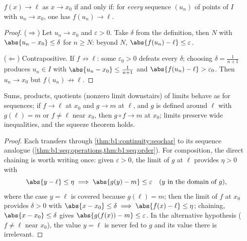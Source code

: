 \begin{theorem}\label{thm:b1:continuity:seqchar}
$f(x) \to \ell$ as $x \to x_0$ if and only if: for \emph{every}
sequence $(u_n)$ of points of $I$ with $u_n \to x_0$, one has
$f(u_n) \to \ell$.
\end{theorem}

\begin{proof}
($\Rightarrow$) Let $u_n \to x_0$ and $\varepsilon > 0$. Take
$\delta$ from the definition, then $N$ with $\abs{u_n - x_0} \leq
\delta$ for $n \geq N$: beyond $N$, $\abs{f(u_n) - \ell} \leq
\varepsilon$.

($\Leftarrow$) Contrapositive. If $f \not\to \ell$: some
$\varepsilon_0 > 0$ defeats every $\delta$; choosing $\delta =
\frac{1}{n+1}$ produces $u_n \in I$ with $\abs{u_n - x_0} \leq
\frac{1}{n+1}$ and $\abs{f(u_n) - \ell} > \varepsilon_0$. Then $u_n
\to x_0$ but $f(u_n) \not\to \ell$.
\end{proof}

\begin{corollary}\label{cor:b1:continuity:operations}
Sums, products, quotients (nonzero limit downstairs) of limits behave
as for sequences; if $f \to \ell$ at $x_0$ and $g \to m$ at $\ell$,
and $g$ is defined around $\ell$ with $g(\ell) = m$ or $f \neq \ell$
near $x_0$, then $g \circ f \to m$ at $x_0$; limits preserve wide
inequalities, and the squeeze theorem holds.
\end{corollary}

\begin{proof}
Each  transfers through
\cref{thm:b1:continuity:seqchar} to its sequence analogue
(\cref{thm:b1:seq:operations,thm:b1:seq:order}). For composition,
the direct chaining is worth writing once: given $\varepsilon >
0$, the limit of $g$ at $\ell$ provides $\eta > 0$ with
\[
\abs{y - \ell} \leq \eta \implies \abs{g(y) - m} \leq
\varepsilon \quad (y \text{ in the domain of } g),
\]
where the case $y = \ell$ is covered because $g(\ell) = m$; then
the limit of $f$ at $x_0$ provides $\delta > 0$ with $\abs{x -
x_0} \leq \delta \implies \abs{f(x) - \ell} \leq \eta$; chaining,
$\abs{x - x_0} \leq \delta$ gives $\abs{g(f(x)) - m} \leq
\varepsilon$. In the alternative hypothesis ($f \neq \ell$ near
$x_0$), the value $y = \ell$ is never fed to $g$ and its value
there is irrelevant.
\end{proof}

